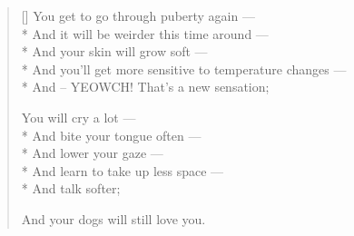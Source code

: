 \begin{verse}[\textwidth]
  You get to go through puberty again ---\\*
  \vin And it will be weirder this time around ---\\*
  \vin And your skin will grow soft ---\\*
  \vin And you'll get more sensitive to temperature changes ---\\*
  \vin And -- YEOWCH! That's a new sensation;

  You will cry a lot ---\\*
  \vin And bite your tongue often ---\\*
  \vin And lower your gaze ---\\*
  \vin And learn to take up less space ---\\*
  \vin And talk softer;

  And your dogs will still love you.
\end{verse}
